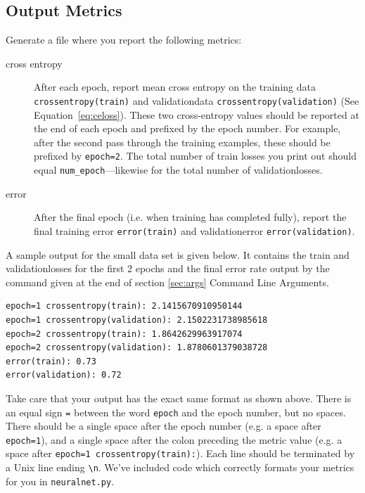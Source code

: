 \documentclass[11pt,addpoints,answers]{exam}
\begin{document}
\subsection{Output Metrics} \label{metrics}
Generate a file where you report the following metrics: 

\begin{description}
\item[cross entropy] After each epoch, report mean cross entropy on the training data \lstinline{crossentropy(train)} and validation\thinspace data \texttt{crossentropy(validation)} (See Equation~\ref{eq:celoss}). These two cross-entropy values should be reported at the end of each epoch and prefixed by the epoch number. For example, after the second pass through the training examples, these should be prefixed by \lstinline{epoch=2}. The total number of train losses you print out should equal \texttt{num\_epoch}---likewise for the total number of validation\thinspace losses.
\item[error] After the final epoch (i.e. when training has completed fully), report the final training error \lstinline{error(train)} and validation\thinspace error \texttt{error(validation)}. 
\end{description}

A sample output for the small data set is given below. It contains the train and validation\thinspace losses for the first 2 epochs and the final error rate output by the command given at the end of section
\ref{sec:args} Command Line Arguments.

\begin{lstlisting}
epoch=1 crossentropy(train): 2.1415670910950144
epoch=1 crossentropy(validation): 2.1502231738985618
epoch=2 crossentropy(train): 1.8642629963917074
epoch=2 crossentropy(validation): 1.8780601379038728
error(train): 0.73
error(validation): 0.72
\end{lstlisting}

Take care that your output has the exact same format as shown above. There is an equal sign \lstinline{=} between the word \lstinline{epoch} and the epoch number, but no spaces. There should be a single space after the epoch number (e.g. a space after \lstinline{epoch=1}), and a single space after the colon preceding the metric value (e.g. a space after \lstinline{epoch=1 crossentropy(train):}). Each line should be terminated by a Unix line ending \lstinline{\n}. We've included code which correctly formats your metrics for you in \texttt{neuralnet.py}.
\end{document}
